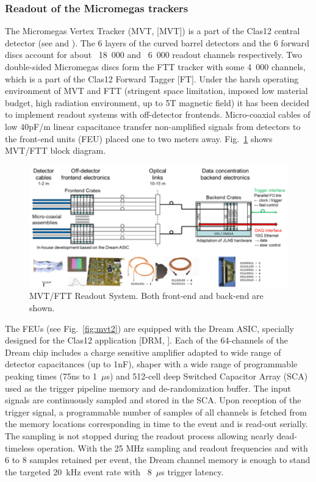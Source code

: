 \subsubsection{Readout of the Micromegas trackers}

The Micromegas Vertex Tracker (MVT, [MVT]) is a part of the Clas12 central detector (see \cite{mvt-ref} and \cite{ftt-ref}). The 6 layers of the curved barrel detectors and the 6 forward discs account for about ~18 000 and ~6 000 readout channels respectively. Two double-sided Micromegas discs form the FTT tracker with some 4 000 channels, which is a part of the Clas12 Forward Tagger [FT]. Under the harsh operating environment of MVT and FTT (stringent space limitation, imposed low material budget, high radiation environment, up to 5T magnetic field) it has been decided to implement readout systems with off-detector frontends. Micro-coaxial cables of low 40pF/m linear capacitance transfer non-amplified signals from detectors to the front-end units (FEU) placed one to two meters away. Fig.~\ref{fig:mvt1} shows MVT/FTT block diagram.

\begin{figure}[hbt]
	\centering
	\includegraphics[width=1.0\columnwidth,keepaspectratio]{img/mvt1.png}
	\caption{MVT/FTT Readout System. Both front-end and back-end are shown.}
	\label{fig:mvt1}
\end{figure}

The FEUs (see Fig.~\ref{fig:mvt2}) are equipped with the Dream ASIC, specially designed for the Clas12 application [DRM, \cite{dream-ref}]. Each of the 64-channels of the Dream chip includes a charge sensitive amplifier adapted to wide range of detector capacitances (up to 1nF), shaper with a wide range of programmable peaking times (75ns to 1~$\mu$s) and 512-cell deep Switched Capacitor Array (SCA) used as the trigger pipeline memory and de-randomization buffer. The input signals are continuously sampled and stored in the SCA. Upon reception of the trigger signal, a programmable number of samples of all channels is fetched from the memory locations corresponding in time to the event and is read-out serially. The sampling is not stopped during the readout process allowing nearly dead-timeless operation. With the 25 MHz sampling and readout frequencies and with 6 to 8 samples retained per event, the Dream channel memory is enough to stand the targeted 20 kHz event rate with ~8~$\mu$s trigger latency.

